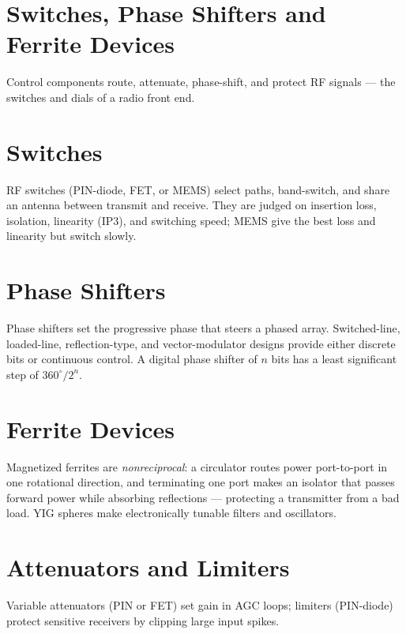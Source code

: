 \section{Switches, Phase Shifters and Ferrite Devices}\label{sec:tb_control}



Control components route, attenuate, phase-shift, and protect RF signals --- the
switches and dials of a radio front end.

\section{Switches}
RF switches (PIN-diode, FET, or MEMS) select paths, band-switch, and share an
antenna between transmit and receive. They are judged on insertion loss,
isolation, linearity (IP3), and switching speed; MEMS give the best loss and
linearity but switch slowly.

\section{Phase Shifters}
Phase shifters set the progressive phase that steers a phased array. Switched-line,
loaded-line, reflection-type, and vector-modulator designs provide either discrete
bits or continuous control. A digital phase shifter of $n$ bits has a least
significant step of $360^\circ/2^n$.

\section{Ferrite Devices}
Magnetized ferrites are \emph{nonreciprocal}: a circulator routes power
port-to-port in one rotational direction, and terminating one port makes an
isolator that passes forward power while absorbing reflections --- protecting a
transmitter from a bad load. YIG spheres make electronically tunable filters and
oscillators.

\section{Attenuators and Limiters}
Variable attenuators (PIN or FET) set gain in AGC loops; limiters (PIN-diode)
protect sensitive receivers by clipping large input spikes.



